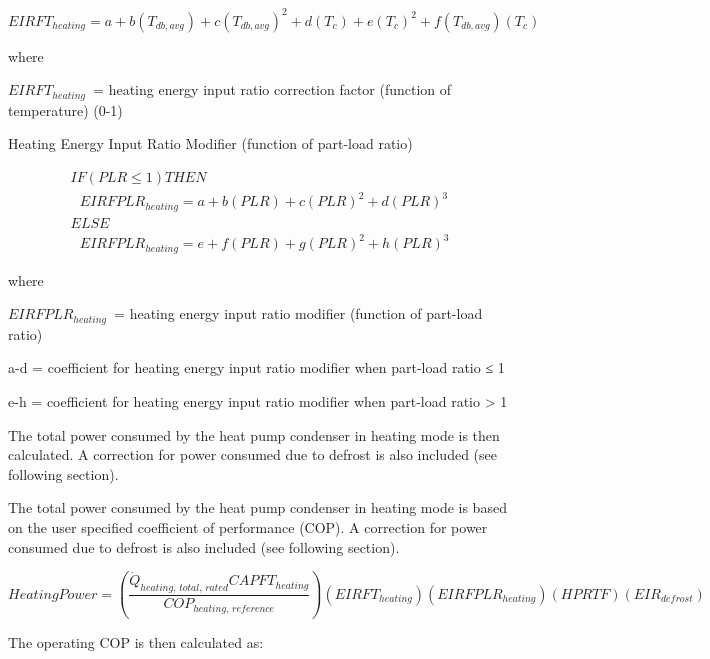 \begin{equation}
  EIRFT_{heating} = a + b \left( T_{db,avg} \right) + c \left( T_{db,avg} \right)^2 + d \left( T_c \right) + e \left( T_c \right)^2 + f \left( T_{db,avg} \right) \left( T_c \right)
\end{equation}

where

\(EIRFT_{heating}\) = heating energy input ratio correction factor (function of temperature) (0-1)

Heating Energy Input Ratio Modifier (function of part-load ratio)

\begin{equation}
  \begin{array}{l}
    IF \left( PLR \le 1 \right) THEN \\
    \,\,\,\,EIRFPLR_{heating} = a + b \left( PLR \right) + c \left( PLR \right)^2 + d \left( PLR \right)^3 \\
    ELSE \\
    \,\,\,\,EIRFPLR_{heating} = e + f \left( PLR \right) + g \left( PLR \right)^2 + h \left( PLR \right)^3
  \end{array}
\end{equation}

where

\(EIRFPLR_{heating}\) = heating energy input ratio modifier (function of part-load ratio)

a-d = coefficient for heating energy input ratio modifier when part-load ratio ≤ 1

e-h = coefficient for heating energy input ratio modifier when part-load ratio > 1

The total power consumed by the heat pump condenser in heating mode is then calculated. A correction for power consumed due to defrost is also included (see following section).

The total power consumed by the heat pump condenser in heating mode is based on the user specified coefficient of performance (COP). A correction for power consumed due to defrost is also included (see following section).

\begin{equation}
  HeatingPower = \left( \frac{\dot{Q}_{heating,\,total,\,rated} CAPFT_{heating}}{COP_{heating,\,reference}} \right) \left( EIRFT_{heating} \right) \left( EIRFPLR_{heating} \right) \left( HPRTF \right) \left( EIR_{defrost} \right)
\end{equation}

The operating COP is then calculated as:

